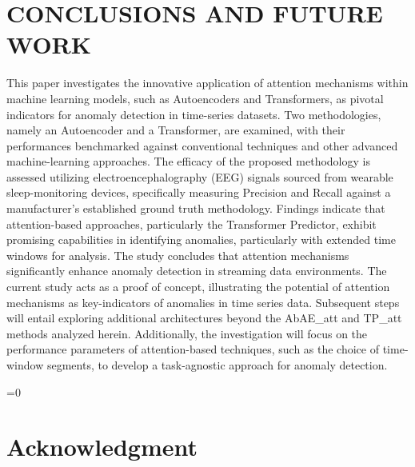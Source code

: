 \documentclass[conference]{IEEEtran}
\def\anon{0}
\begin{document}


\section{CONCLUSIONS AND FUTURE WORK}
\label{sec:conc}
This paper investigates the innovative application of attention mechanisms within machine learning models, such as Autoencoders and Transformers, as pivotal indicators for anomaly detection in time-series datasets. Two methodologies, namely an Autoencoder and a Transformer, are examined, with their performances benchmarked against conventional techniques and other advanced machine-learning approaches. The efficacy of the proposed methodology is assessed utilizing electroencephalography (EEG) signals sourced from wearable sleep-monitoring devices, specifically measuring Precision and Recall against a manufacturer's established ground truth methodology. Findings indicate that attention-based approaches, particularly the Transformer Predictor, exhibit promising capabilities in identifying anomalies, particularly with extended time windows for analysis. The study concludes that attention mechanisms significantly enhance anomaly detection in streaming data environments.
The current study acts as a proof of concept, illustrating the potential of attention mechanisms as key-indicators of anomalies in time series data. Subsequent steps will entail exploring additional architectures beyond the AbAE\_att and TP\_att methods analyzed herein. Additionally, the investigation will focus on the performance parameters of attention-based techniques, such as the choice of time-window segments, to develop a task-agnostic approach for anomaly detection.



\ifnum\anon=0

\section*{Acknowledgment}
\end{document}
